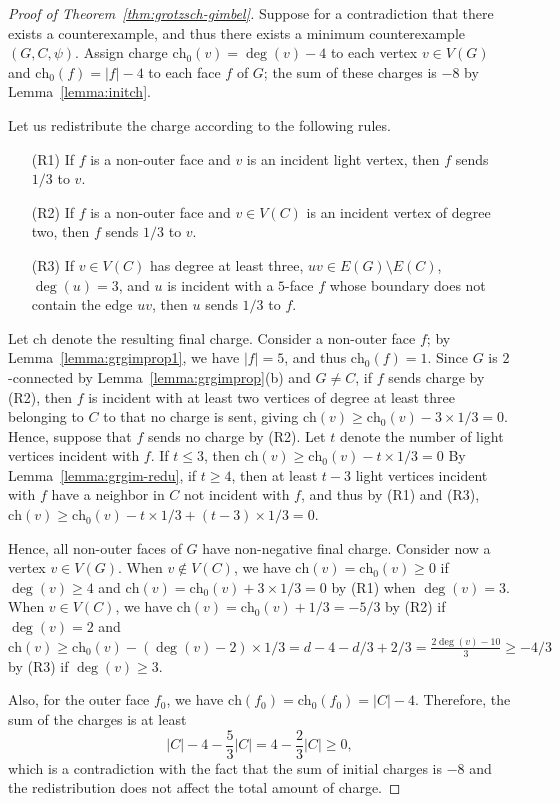 \documentclass[12pt,twoside,openright,a4paper]{book}
\newcommand{\initch}{\text{ch}_0}
\newcommand{\finch}{\text{ch}}
\begin{document}
\begin{proof}[Proof of Theorem~\ref{thm:grotzsch-gimbel}]
Suppose for a contradiction that there exists a counterexample, and thus there exists a minimum counterexample
$(G,C,\psi)$.  Assign charge $\initch(v)=\deg(v)-4$ to each vertex $v\in V(G)$ and $\initch(f)=|f|-4$ to each
face $f$ of $G$; the sum of these charges is $-8$ by Lemma~\ref{lemma:initch}.

Let us redistribute the charge according to the following rules.
\begin{itemize}
\item[(R1)] If $f$ is a non-outer face and $v$ is an incident light vertex,
then $f$ sends $1/3$ to $v$.
\item[(R2)] If $f$ is a non-outer face and $v\in V(C)$ is an incident vertex of degree two,
then $f$ sends $1/3$ to $v$.
\item[(R3)] If $v\in V(C)$ has degree at least three, $uv\in E(G)\setminus E(C)$, $\deg(u)=3$,
and $u$ is incident with a $5$-face $f$ whose boundary does not contain the edge $uv$, then $u$ sends $1/3$ to $f$.
\end{itemize}
Let $\finch$ denote the resulting final charge.  Consider a non-outer face $f$; by Lemma~\ref{lemma:grgimprop1},
we have $|f|=5$, and thus $\initch(f)=1$.  Since $G$ is $2$-connected by Lemma~\ref{lemma:grgimprop}(b) and $G\neq C$,
if $f$ sends charge by (R2), then $f$ is incident with at least two vertices of degree at least three belonging to $C$
to that no charge is sent, giving $\finch(v)\ge \initch(v)-3\times 1/3=0$.  Hence, suppose that $f$ sends no charge by
(R2).  Let $t$ denote the number of light vertices incident with $f$.  If $t\le 3$, then $\finch(v)\ge \initch(v)-t\times 1/3=0$
By Lemma~\ref{lemma:grgim-redu}, if $t\ge 4$, then at least $t-3$ light vertices incident with $f$ have a neighbor in $C$ not
incident with $f$, and thus by (R1) and (R3), $\finch(v)\ge \initch(v)-t\times 1/3+(t-3)\times1/3=0$.

Hence, all non-outer faces of $G$ have non-negative final charge.  Consider now a vertex $v\in V(G)$.  When $v\not\in V(C)$, we have
$\finch(v)=\initch(v)\ge 0$ if $\deg(v)\ge 4$ and $\finch(v)=\initch(v)+3\times1/3=0$ by (R1) when $\deg(v)=3$.  When
$v\in V(C)$, we have $\finch(v)=\initch(v)+1/3=-5/3$ by (R2) if $\deg(v)=2$ and
$\finch(v)\ge \initch(v)-(\deg(v)-2)\times 1/3=d-4-d/3+2/3=\frac{2\deg(v)-10}{3}\ge -4/3$ by (R3) if $\deg(v)\ge 3$.

Also, for the outer face $f_0$, we have $\finch(f_0)=\initch(f_0)=|C|-4$.  Therefore, the sum of the charges
is at least
$$|C|-4-\frac{5}{3}|C|=4-\frac{2}{3}|C|\ge 0,$$
which is a contradiction with the fact that the sum of initial charges is $-8$ and the redistribution does not affect
the total amount of charge.
\end{proof}
\end{document}
